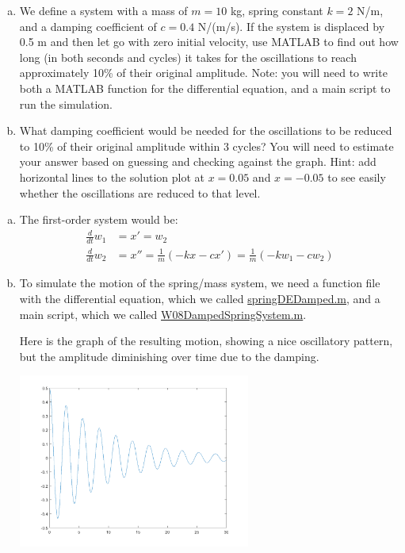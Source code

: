 \begin{enumerate}
\begin{Question}
\begin{enumerate}[(a)]
\item We define a system with a mass of $m = 10$ kg, spring constant
  $k = 2$ N/m, and a damping coefficient of $c = 0.4$ N/(m/s).  If the
  system is displaced by 0.5 m and then let go with zero initial
  velocity, use MATLAB to find out how long (in both seconds and
  cycles) it takes for the oscillations to reach approximately 10\% of
  their original amplitude.  Note: you will need to write both a
  MATLAB function for the differential equation, and a main script to
  run the simulation.
\item What damping coefficient would be needed for the oscillations to
  be reduced to 10\% of their original amplitude within 3 cycles?  You
  will need to estimate your answer based on guessing and checking
  against the graph.  Hint: add horizontal lines to the solution plot
  at $x = 0.05$ and $x = -0.05$ to see easily whether the oscillations
  are reduced to that level.
\end{enumerate}
\end{Question}

\begin{Solution}
  \begin{enumerate}[(a)]
 \item  The first-order system would be:
 \begin{align*}
 \frac{d}{dt} w_1 & = x' = w_2 \\
 \frac{d}{dt} w_2 & = x'' = \frac{1}{m} \left(-kx -c x'\right) = \frac{1}{m} \left(-k w_1  - c w_2\right)
 \end{align*}

\item To simulate the motion of the spring/mass system, we need a
  function file with the differential equation, which we called
  \href{http://www.mast.queensu.ca/~apsc171/MNTCP01/PracticeProblems/MATLAB/springDEDamped.m}{springDEDamped.m},
  and a main script, which we called
  \href{http://www.mast.queensu.ca/~apsc171/MNTCP01/PracticeProblems/MATLAB/W08DampedSpringSystem.m}{W08DampedSpringSystem.m}.

  Here is the graph of the resulting motion, showing a nice
  oscillatory pattern, but the amplitude diminishing over time due to
  the damping.

\begin{center}
\includegraphics[width=3in]{graphics/Week08_Spring/W08DampedSpring1A}
\end{center}


\end{enumerate}
\end{Solution}
\end{enumerate}
